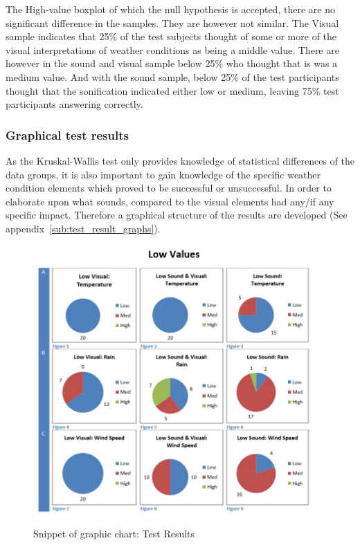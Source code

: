 The High-value boxplot of which the null hypothesis is accepted, there are no significant difference in the samples. 
They are however not similar.
The Visual sample indicates that 25\% of the test subjects thought of some or more of the visual interpretations of weather conditions as being a middle value. 
There are however in the sound and visual sample below 25\% who thought that is was a medium value. 
And with the sound sample, below 25\% of the test participants thought that the sonification indicated either low or medium, leaving 75\% test participants answering correctly.



\FloatBarrier
\subsubsection*{Graphical test results} %
\label{ssub:graphical_test_results}

As the Kruskal-Wallis test only provides knowledge of statistical differences of the data groups, it is also important to gain knowledge of the specific weather condition elements which proved to be successful or unsuccessful. 
In order to elaborate upon what sounds, compared to the visual elements had any/if any specific impact. 
Therefore a graphical structure of the results are developed (See appendix~\ref{sub:test_result_graphs}).

\begin{figure}[!htbp]
    \centering
    \includegraphics[width=.7\textwidth]{images/Evaluation4.jpg}
    \caption{Snippet of graphic chart: Test Results}
    \label{fig:evaluation4}
\end{figure}

